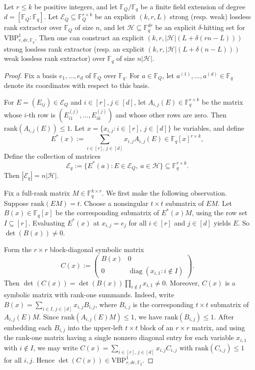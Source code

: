 \documentclass[11pt]{article}
\newcommand{\rank}{\mathrm{rank}}
\newcommand{\F}{\mathbb{F}}
\newcommand{\VBP}{\mathrm{VBP}}
\newcommand{\VP}[3]{\VBP_{#1,#2,#3}^1}
\begin{document}
\begin{lemma}\label{lem:hittingsetVBPtoRankExtractor}
Let $r\le k$ be positive integers, and let $\F_Q/\F_q$ be a finite field extension
of degree $d=[\F_Q:\F_q]$. Let
$\mathcal{E}_Q\subseteq \F_Q^{r\times k}$ be an explicit $(k,r,L)$ strong (resp. weak) lossless
rank extractor over $\F_Q$ of size $n$, and let
$\mathcal{H}\subseteq \F_q^{dr}$ be an explicit $\delta$-hitting set for
$\VP{r}{dr}{\F_q}$. Then one can construct an explicit
$(k,r,|\mathcal{H}|(L+\delta(rn-L)))$ strong lossless rank extractor (resp. an explicit
$(k,r,|\mathcal{H}|(L+\delta(n-L)))$ weak lossless rank extractor) over
$\F_q$ of size $n|\mathcal{H}|$.
\end{lemma}

\begin{proof}
Fix a basis $e_1,\dots,e_d$ of $\F_Q$ over $\F_q$.
For $a\in\F_Q$, let $a^{(1)},\dots,a^{(d)}\in\F_q$ denote its coordinates
with respect to this basis.

For $E=(E_{ij})\in\mathcal{E}_Q$ and $i\in[r],j\in[d]$, let
$A_{i,j}(E)\in\F_q^{r\times k}$ be the matrix whose $i$-th row is
$(E_{i1}^{(j)},\dots,E_{ik}^{(j)})$ and whose other rows are zero.
Then $\rank(A_{i,j}(E))\le 1$. 
Let $x=\{x_{i,j} : i\in [r],\, j\in [d]\}$ be variables, and define
\[
E^*(x):=\sum_{i\in[r],\,j\in[d]}x_{i,j}A_{i,j}(E)
\in\F_q[x]^{r\times k},
\]
Define the collection of matrices
\[
\mathcal{E}_q := \{E^*(a) : E\in \mathcal{E}_Q,\ a\in \mathcal{H}\}\subseteq \F_q^{r\times k}.
\]
Then $|\mathcal{E}_q|=n|\mathcal{H}|$.

Fix a full-rank matrix $M\in\F_q^{k\times r}$. We first make the following
observation. Suppose $\rank(EM)=t$. Choose a nonsingular $t\times t$ submatrix
of $EM$. Let $B(x)\in\F_q[x]$ be the corresponding submatrix of $E^*(x)M$, using the
row set $I\subseteq [r]$.
Evaluating $E^*(x)$ at $x_{i,j}=e_j$ for all $i\in [r]$ and $j\in [d]$ yields $E$. So $\det(B(x))\neq 0$.

Form the $r\times r$
block-diagonal symbolic matrix
\[
C(x):=
\begin{pmatrix}
B(x) & 0\\
0 & \operatorname{diag}(x_{i,1}:i\notin I)
\end{pmatrix}.
\]
Then $\det(C(x))=\det(B(x))\prod_{i\notin I}x_{i,1}\neq 0$.
Moreover, $C(x)$ is a symbolic matrix with rank-one summands. Indeed, write $B(x)=\sum_{i\in I,\,j\in[d]}x_{i,j}B_{i,j}$,
where $B_{i,j}$ is the corresponding $t\times t$ submatrix of
$A_{i,j}(E)M$. Since $\rank(A_{i,j}(E)M)\le 1$, we have
$\rank(B_{i,j})\le 1$. After embedding each $B_{i,j}$ into the upper-left
$t\times t$ block of an $r\times r$ matrix, and using the rank-one matrix
having a single nonzero diagonal entry for each variable $x_{i,1}$ with
$i\notin I$, we may write $C(x)=\sum_{i\in[r],\,j\in[d]}x_{i,j}C_{i,j}$
with $\rank(C_{i,j})\le 1$ for all $i,j$. Hence $\det(C(x))\in\VP{r}{dr}{\F_q}$.


\end{proof}
\end{document}

